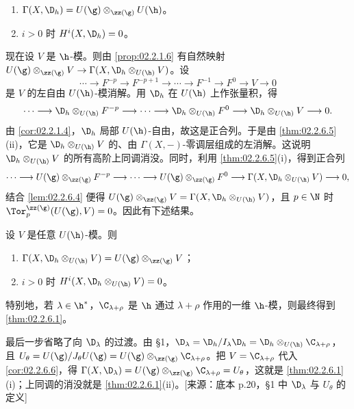 \begin{theorem}\label{thm:02.2.6.5}
\begin{enumerate}[label=(\roman*)]
  \item $\Gamma(X,\D_h)=U(\g)\otimes_{\zz(\g)}U(\h)$。
  \item $i>0$ 时 $H^i(X,\D_h)=0$。
\end{enumerate}
\end{theorem}

现在设 $V$ 是 $\h$-模。则由 \ref{prop:02.2.1.6} 有自然映射 $U(\g)\otimes_{\zz(\g)}V\to\Gamma(X,\D_h\otimes_{U(\h)}V)$。设
\[
\cdots\longrightarrow F^{-p}\longrightarrow F^{-p+1}\longrightarrow\cdots\longrightarrow F^{-1}\longrightarrow F^0\longrightarrow V\longrightarrow 0
\]
是 $V$ 的左自由 $U(\h)$-模消解。用 $\D_h$ 在 $U(\h)$ 上作张量积，得
\[
\cdots\longrightarrow \D_h\otimes_{U(\h)}F^{-p}\longrightarrow\cdots\longrightarrow \D_h\otimes_{U(\h)}F^0\longrightarrow \D_h\otimes_{U(\h)}V\longrightarrow 0 .
\]
由 \ref{cor:02.2.1.4}，$\D_h$ 局部 $U(\h)$-自由，故这是正合列。于是由 \ref{thm:02.2.6.5}(ii)，它是 $\D_h\otimes_{U(\h)}V$ 的、由 $\Gamma(X,-)$-零调层组成的左消解。这说明 $\D_h\otimes_{U(\h)}V$ 的所有高阶上同调消没。同时，利用 \ref{thm:02.2.6.5}(i)，得到正合列
\[
\cdots\longrightarrow U(\g)\otimes_{\zz(\g)}F^{-p}\longrightarrow\cdots\longrightarrow U(\g)\otimes_{\zz(\g)}F^0\longrightarrow\Gamma(X,\D_h\otimes_{U(\h)}V)\longrightarrow 0,
\]
结合 \ref{lem:02.2.6.4} 便得 $U(\g)\otimes_{\zz(\g)}V=\Gamma(X,\D_h\otimes_{U(\h)}V)$，且 $p\in\N$ 时 $\Tor_p^{\zz(\g)}(U(\g),V)=0$。因此有下述结果。

\begin{corollary}\label{cor:02.2.6.6}
设 $V$ 是任意 $U(\h)$-模。则
\begin{enumerate}[label=(\roman*)]
  \item $\Gamma(X,\D_h\otimes_{U(\h)}V)=U(\g)\otimes_{\zz(\g)}V$；
  \item $i>0$ 时 $H^i(X,\D_h\otimes_{U(\h)}V)=0$。
\end{enumerate}
\end{corollary}

特别地，若 $\lambda\in\h^*$，$\C_{\lambda+\rho}$ 是 $\h$ 通过 $\lambda+\rho$ 作用的一维 $\h$-模，则最终得到 \ref{thm:02.2.6.1}。
\begin{annote}
最后一步省略了向 $\D_\lambda$ 的过渡。由 §1，$\D_\lambda=\D_h/I_\lambda \D_h=\D_h\otimes_{U(\h)}\C_{\lambda+\rho}$，且 $U_\theta=U(\g)/J_\theta U(\g)=U(\g)\otimes_{\zz(\g)}\C_{\lambda+\rho}$。把 $V=\C_{\lambda+\rho}$ 代入 \ref{cor:02.2.6.6}，得 $\Gamma(X,\D_\lambda)=U(\g)\otimes_{\zz(\g)}\C_{\lambda+\rho}=U_\theta$，这就是 \ref{thm:02.2.6.1}(i)；上同调的消没就是 \ref{thm:02.2.6.1}(ii)。[来源：底本 p.20，§1 中 $\D_\lambda$ 与 $U_\theta$ 的定义]
\end{annote}
